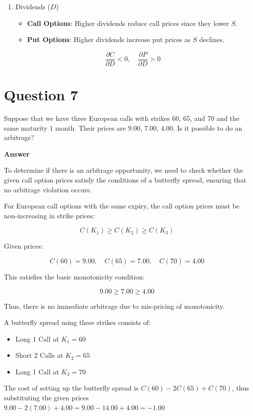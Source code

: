 \documentclass[letterpaper]{article}
\begin{document}
\begin{enumerate}
		\item Dividends ($D$)
		\begin{itemize}
			\item \textbf{Call Options}: Higher dividends {reduce} call prices since they lower $S$.
			\item \textbf{Put Options}: Higher dividends {increase} put prices as $S$ declines.
		\end{itemize}
	    $$
			\frac{\partial C}{\partial D} < 0, \quad \frac{\partial P}{\partial D} > 0
		$$
		\end{enumerate}
		
		
		
		\clearpage
		\section{Question 7}
		Suppose that we have three European calls with strikes 60, 65, and 70 and the same maturity 1 month. Their prices are $9.00$, $7.00$, $4.00$. Is it possible to do an arbitrage?
		
		\textbf{Answer}
		
		To determine if there is an arbitrage opportunity, we need to check whether the given call option prices satisfy the conditions of a butterfly spread, ensuring that no arbitrage violation occurs.

		For European call options with the same expiry, the call option prices must be non-increasing in strike prices:
		
		\[
		C(K_1) \geq C(K_2) \geq C(K_3)
		\]
		
		Given prices:
		
		\[
		C(60) = 9.00, \quad C(65) = 7.00, \quad C(70) = 4.00
		\]
		
		This satisfies the basic monotonicity condition:
		
		\[
		9.00 \geq 7.00 \geq 4.00
		\]
		
		Thus, there is no immediate arbitrage due to mis-pricing of monotonicity.
		
		A butterfly spread using these strikes consists of:
		
		\begin{itemize}
			\item Long 1 Call at \( K_1 = 60 \)
			\item Short 2 Calls at \( K_2 = 65 \)
			\item Long 1 Call at \( K_3 = 70 \)
		\end{itemize}
		
		The cost of setting up the butterfly spread is $C(60) - 2C(65) + C(70)$, thus substituting the given prices $9.00 - 2(7.00) + 4.00 = 9.00 - 14.00 + 4.00 = -1.00$
		
\end{document}
